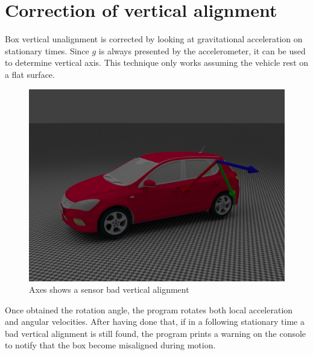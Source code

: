 \section{Correction of vertical alignment}
Box vertical unalignment is corrected by looking at gravitational acceleration on stationary times. Since $g$ is always presented by the accelerometer, it can be used to determine vertical axis. This technique only works assuming the vehicle rest on a flat surface. 
\begin{figure}[H]
\includegraphics[width=\textwidth]{kia_bad_z_align.jpg}
\caption{Axes shows a sensor bad vertical alignment}
\end{figure}

Once obtained the rotation angle, the program rotates both local acceleration and angular velocities. After having done that, if in a following stationary time a bad vertical alignment is still found, the program prints a warning on the console to notify that the box become misaligned during motion.

